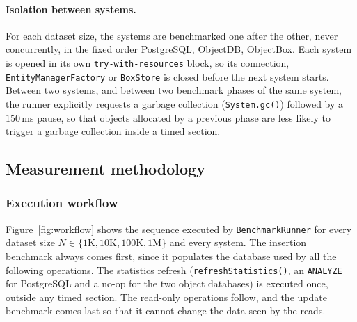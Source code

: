 \documentclass{article}
\begin{document}
\paragraph{Isolation between systems.} For each dataset size, the systems are benchmarked one after the other, never concurrently, in the fixed order PostgreSQL, ObjectDB, ObjectBox. Each system is opened in its own \texttt{try-with-resources} block, so its connection, \texttt{EntityManagerFactory} or \texttt{BoxStore} is closed before the next system starts. Between two systems, and between two benchmark phases of the same system, the runner explicitly requests a garbage collection (\texttt{System.gc()}) followed by a $150$\,ms pause, so that objects allocated by a previous phase are less likely to trigger a garbage collection inside a timed section.

\subsection{Measurement methodology}
\label{subsec:methodology}

\subsubsection{Execution workflow}
Figure~\ref{fig:workflow} shows the sequence executed by \texttt{BenchmarkRunner} for every dataset size $N \in \{1\text{K}, 10\text{K}, 100\text{K}, 1\text{M}\}$ and every system. The insertion benchmark always comes first, since it populates the database used by all the following operations. The statistics refresh (\texttt{refreshStatistics()}, an \texttt{ANALYZE} for PostgreSQL and a no-op for the two object databases) is executed once, outside any timed section. The read-only operations follow, and the update benchmark comes last so that it cannot change the data seen by the reads.
\end{document}
